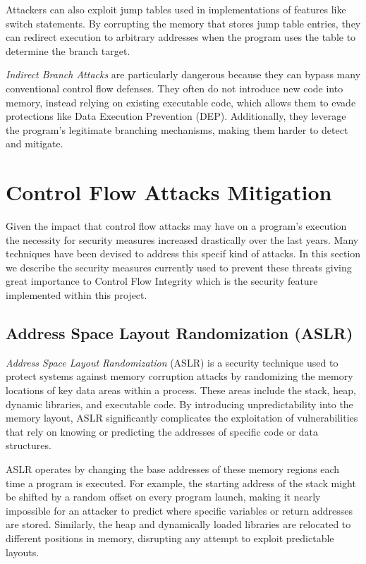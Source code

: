 Attackers can also exploit jump tables used in implementations of features like switch
statements. By corrupting the memory that stores jump table entries, they can redirect
execution to arbitrary addresses when the program uses the table to determine the
branch target.

\textit{Indirect Branch Attacks} are particularly dangerous because they can
bypass many conventional control flow defenses. They often do not introduce new code
into memory, instead relying on existing executable code, which allows them to evade
protections like Data Execution Prevention (DEP). Additionally, they leverage the
program's legitimate branching mechanisms, making them harder to detect and
mitigate.

\section{Control Flow Attacks Mitigation}
\label{sec:background_mitigation}

Given the impact that control flow attacks may have on a program's execution the
necessity for security measures increased drastically over the last years. Many
techniques have been devised to address this specif kind of attacks. In this section
we describe the security measures currently used to prevent these threats giving
great importance to Control Flow Integrity which is the security feature implemented
within this project.

\subsection{Address Space Layout Randomization (ASLR)}
\label{subsec:background_aslr}

\textit{Address Space Layout Randomization} (ASLR) is a security technique used to
protect systems against memory corruption attacks by randomizing the memory locations
of key data areas within a process. These areas include the stack, heap, dynamic
libraries, and executable code. By introducing unpredictability into the memory
layout, ASLR significantly complicates the exploitation of vulnerabilities that rely
on knowing or predicting the addresses of specific code or data structures.

ASLR operates by changing the base addresses of these memory regions each time a
program is executed. For example, the starting address of the stack might be shifted
by a random offset on every program launch, making it nearly impossible for an
attacker to predict where specific variables or return addresses are stored. Similarly,
the heap and dynamically loaded libraries are relocated to different positions
in memory, disrupting any attempt to exploit predictable layouts.

